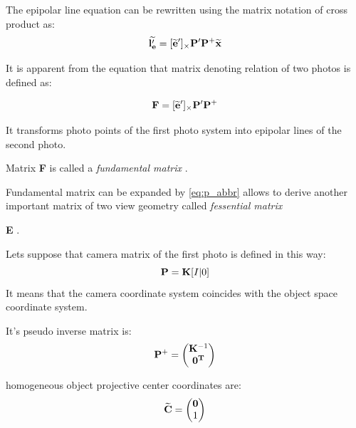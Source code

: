 \documentclass[a4paper,12pt]{article}
\newcommand{\ematr}[1]{
{\bf #1}
}
\newcommand{\evect}[1]{
{\bf #1}
}
\newcommand{\ehvect}[1]{
{\bf \widetilde{#1}}
}
\newcommand{\term}[1]{
{\it #1}%
}
\begin{document}
The epipolar line equation can be rewritten using the matrix notation of cross product as:
\begin{equation}
\ehvect{l'_{e}}  = [\ehvect{e}']_{\times} \ematr{P'}\ematr{P}^{+}\ehvect{x}
\end{equation}


It is apparent from the equation that matrix denoting relation of two photos is defined as:

\begin{equation}
\ematr{F}  = [\ehvect{e}']_{\times} \ematr{P'}\ematr{P}^{+}
\end{equation}

It transforms photo points of the first photo system into 
epipolar lines of the second photo.


Matrix \ematr{F} is called a \term{fundamental matrix}. 

Fundamental matrix can be expanded by \eqref{eq:p_abbr}
allows to derive another important matrix of two view geometry called \term{fessential matrix} \ematr{E}.

Lets suppose that camera matrix of the first photo is defined in this way:
\begin{equation}
\label{eq:rel_or_cam1}
\ematr{P}  = \ematr{K} \ematr{[}I|0\ematr{]}
\end{equation}
It means that the camera coordinate system coincides with  the object space coordinate 
system.

It's pseudo inverse matrix is:
\begin{equation}
\ematr{P}^{+} =
\begin{pmatrix}
   \ematr{K}^{-1} \\
   \evect{0^{T}} \\
\end{pmatrix}
\end{equation}

homogeneous object projective center coordinates are:
\begin{equation}
\ehvect{C} =
\begin{pmatrix}
   \evect{0} \\
    1 \\
\end{pmatrix}
\end{equation}
\end{document}
